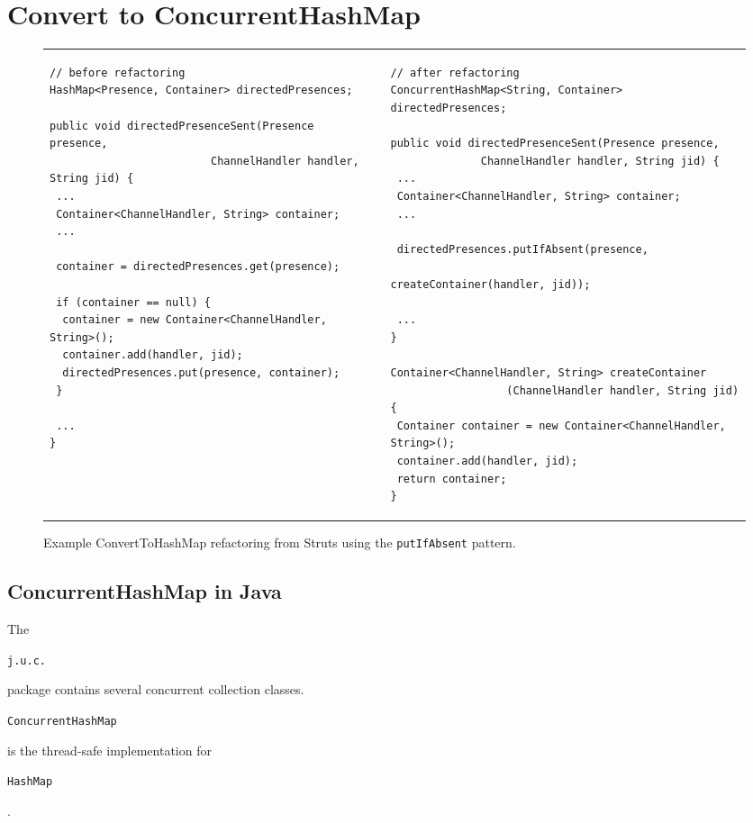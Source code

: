 \documentclass[10pt,preprint]{sigplanconf}
\newenvironment{CodeOut}{\begin{scriptsize}}{\end{scriptsize}}
\newcommand{\code}[1]{\begin{small}\texttt{#1}\end{small}}
\newcommand{\MaxWidth}{\columnwidth}
\begin{document}
\section{Convert to ConcurrentHashMap}
\begin{figure*}[t]
\begin{CodeOut}
\begin{tabular}{@{}l|l@{}}
\begin{minipage}[t]{\MaxWidth}
\begin{verbatim}
// before refactoring
HashMap<Presence, Container> directedPresences;

public void directedPresenceSent(Presence presence,
     				 	 ChannelHandler handler, String jid) {
 ...
 Container<ChannelHandler, String> container;
 ...
 
 container = directedPresences.get(presence);

 if (container == null) {
  container = new Container<ChannelHandler, String>();
  container.add(handler, jid);
  directedPresences.put(presence, container);
 }

 ...
}
\end{verbatim}
\end{minipage}
&
\begin{minipage}[t]{\MaxWidth}
\begin{verbatim}
// after refactoring
ConcurrentHashMap<String, Container> directedPresences;

public void directedPresenceSent(Presence presence,
              ChannelHandler handler, String jid) {
 ...
 Container<ChannelHandler, String> container;
 ...
 
 directedPresences.putIfAbsent(presence,
                               createContainer(handler, jid));
 
 ...
}

Container<ChannelHandler, String> createContainer
                  (ChannelHandler handler, String jid) {
 Container container = new Container<ChannelHandler, String>();
 container.add(handler, jid);
 return container;
}

\end{verbatim}
\end{minipage}
\end{tabular}
\end{CodeOut}
\caption{Example ConvertToHashMap refactoring from Struts using the
\texttt{putIfAbsent} pattern.}
\label{fig:putIfAbsent}
\end{figure*}

\subsection{ConcurrentHashMap in Java}
The \code{j.u.c.} package contains several concurrent collection classes. 
\code{ConcurrentHashMap} is the thread-safe implementation for \code{HashMap}.
\end{document}
